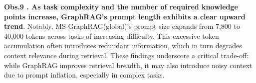 \documentclass{article} %
\begin{document}
\textbf{Obs.9 . As task complexity and the number of required knowledge points increase, GraphRAG’s prompt length exhibits a clear upward trend}. Notably, MS-GraphRAG(global)’s prompt size expands from 7,800 to 40,000 tokens across tasks of increasing difficulty. This excessive token accumulation often introduces redundant information, which in turn degrades context relevance during retrieval. These findings underscore a critical trade-off: while GraphRAG improves retrieval breadth, it may also introduce noisy context due to prompt inflation, especially in complex tasks.

\end{document}
